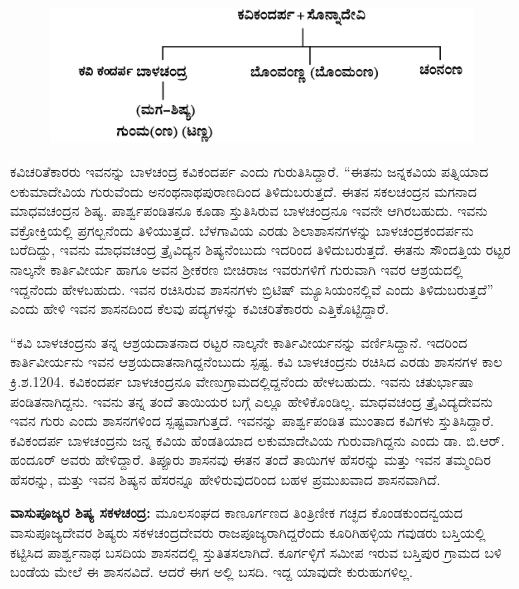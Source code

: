 \newpage

\begin{figure}[H]
\includegraphics{images/chap4/chap4fig1.jpeg}
\end{figure}


ಕವಿಚರಿತೆಕಾರರು ಇವನನ್ನು ಬಾಳಚಂದ್ರ ಕವಿಕಂದರ್ಪ ಎಂದು ಗುರುತಿಸಿದ್ದಾರೆ. “ಈತನು ಜನ್ನಕವಿಯ ಪತ್ನಿಯಾದ ಲಕುಮಾದೇವಿಯ ಗುರುವೆಂದು ಅನಂಥನಾಥಪುರಾಣದಿಂದ ತಿಳಿದುಬರುತ್ತದೆ. ಈತನ ಸಕಲಚಂದ್ರನ ಮಗನಾದ ಮಾಧವಚಂದ್ರನ ಶಿಷ್ಯ. ಪಾರ್ಶ್ವಪಂಡಿತನೂ ಕೂಡಾ ಸ್ತುತಿಸಿರುವ ಬಾಳಚಂದ್ರನೂ ಇವನೇ ಆಗಿರಬಹುದು. ಇವನು ವಕ್ರೋಕ್ತಿಯಲ್ಲಿ ಪ್ರಗಲ್ಬನೆಂದು ತಿಳಿಯುತ್ತದೆ. ಬೆಳಗಾವಿಯ ಎರಡು ಶಿಲಾಶಾಸನಗಳನ್ನು ಬಾಳಚಂದ್ರಕಂದರ್ಪನು ಬರೆದಿದ್ದು, ಇವನು ಮಾಧವಚಂದ್ರ ತ್ರೈವಿದ್ಯನ ಶಿಷ್ಯನೆಂಬುದು ಇದರಿಂದ ತಿಳಿದುಬರುತ್ತದೆ. ಈತನು ಸೌಂದತ್ತಿಯ ರಟ್ಟರ ನಾಲ್ಕನೇ ಕಾರ್ತಿವೀರ್ಯ ಹಾಗೂ ಅವನ ಶ‍್ರೀಕರಣ ಬೀಚಿರಾಜ ಇವರುಗಳಿಗೆ ಗುರುವಾಗಿ ಇವರ ಆಶ್ರಯದಲ್ಲಿ ಇದ್ದನೆಂದು ಹೇಳಬಹುದು. ಇವನ ರಚಿಸಿರುವ ಶಾಸನಗಳು ಬ್ರಿಟಿಷ್​ ಮ್ಯೂಸಿಯಂನಲ್ಲಿವೆ ಎಂದು ತಿಳಿದುಬರುತ್ತದೆ” ಎಂದು ಹೇಳಿ ಇವನ ಶಾಸನದಿಂದ ಕೆಲವು ಪದ್ಯಗಳನ್ನು ಕವಿಚರಿತೆಕಾರರು ಎತ್ತಿಕೊಟ್ಟಿದ್ದಾರೆ.

“ಕವಿ ಬಾಳಚಂದ್ರನು ತನ್ನ ಆಶ್ರಯದಾತನಾದ ರಟ್ಟರ ನಾಲ್ಕನೇ ಕಾರ್ತಿವೀರ್ಯನನ್ನು ವರ್ಣಿಸಿದ್ದಾನೆ. ಇದರಿಂದ ಕಾರ್ತಿವೀರ್ಯನು ಇವನ ಆಶ್ರಯದಾತನಾಗಿದ್ದನೆಂಬುದು ಸ್ಪಷ್ಟ. ಕವಿ ಬಾಳಚಂದ್ರನು ರಚಿಸಿದ ಎರಡು ಶಾಸನಗಳ ಕಾಲ ಕ್ರಿ.ಶ.1204. ಕವಿಕಂದರ್ಪ ಬಾಳಚಂದ್ರನೂ ವೇಣುಗ್ರಾಮದಲ್ಲಿದ್ದನೆಂದು ಹೇಳಬಹುದು. ಇವನು ಚತುರ್ಭಾಷಾ ಪಂಡಿತನಾಗಿದ್ದನು. ಇವನು ತನ್ನ ತಂದೆ ತಾಯಿಯರ ಬಗ್ಗೆ ಎಲ್ಲೂ ಹೇಳಿಕೊಂಡಿಲ್ಲ. ಮಾಧವಚಂದ್ರ ತ್ರೈವಿದ್ಯದೇವನು ಇವನ ಗುರು ಎಂದು ಶಾಸನಗಳಿಂದ ಸ್ಪಷ್ಟವಾಗುತ್ತದೆ. ಇವನನ್ನು ಪಾರ್ಶ್ವಪಂಡಿತ ಮುಂತಾದ ಕವಿಗಳು ಸ್ತುತಿಸಿದ್ದಾರೆ. ಕವಿಕಂದರ್ಪ ಬಾಳಚಂದ್ರನು ಜನ್ನ ಕವಿಯ ಹೆಂಡತಿಯಾದ ಲಕುಮಾದೇವಿಯ ಗುರುವಾಗಿದ್ದನು ಎಂದು ಡಾ. ಬಿ.ಆರ್​. ಹಂದೂರ್​ ಅವರು ಹೇಳಿದ್ದಾರೆ. ತಿಪ್ಪೂರು ಶಾಸನವು ಈತನ ತಂದೆ ತಾಯಿಗಳ ಹೆಸರನ್ನು ಮತ್ತು ಇವನ ತಮ್ಮಂದಿರ ಹೆಸರನ್ನು, ಮತ್ತು ಇವನ ಶಿಷ್ಯನ ಹೆಸರನ್ನೂ ಹೇಳಿರುವುದರಿಂದ ಬಹಳ ಪ್ರಮುಖವಾದ ಶಾಸನವಾಗಿದೆ.

\textbf{ವಾಸುಪೂಜ್ಯರ ಶಿಷ್ಯ ಸಕಳಚಂದ್ರ:} ಮೂಲಸಂಘದ ಕಾಣೂರ್ಗಣದ ತಿಂತ್ರಿಣೀಕ ಗಚ್ಛದ ಕೊಂಡಕುಂದನ್ವಯದ ವಾಸುಪೂಜ್ಯದೇವರ ಶಿಷ್ಯರು ಸಕಳಚಂದ್ರದೇವರು ರಾಜಪೂಜ್ಯರಾಗಿದ್ದರೆಂದು ಕೂರಿಗಿಹಳ್ಳಿಯ ಗವುಡರು ಬಸ್ತಿಯಲ್ಲಿ ಕಟ್ಟಿಸಿದ ಪಾರ್ಶ್ವನಾಥ ಬಸದಿಯ ಶಾಸನದಲ್ಲಿ ಸ್ತುತಿತಸಲಾಗಿದೆ. ಕೂರ್ಗಳ್ಳಿಗೆ ಸಮೀಪ ಇರುವ ಬಸ್ತಿಪುರ ಗ್ರಾಮದ ಬಳಿ ಬಂಡೆಯ ಮೇಲೆ ಈ ಶಾಸನವಿದೆ. ಆದರೆ ಈಗ ಅಲ್ಲಿ ಬಸದಿ. ಇದ್ದ ಯಾವುದೇ ಕುರುಹುಗಳಿಲ್ಲ.


